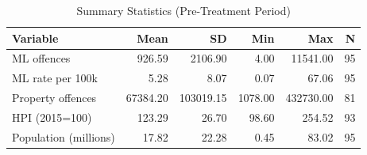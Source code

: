 \begin{table}[!h]
\centering
\caption{\label{tab:tab:summary}Summary Statistics (Pre-Treatment Period)}
\centering
\begin{tabular}[t]{lrrrrr}
\toprule
Variable & Mean & SD & Min & Max & N\\
\midrule
ML offences & 926.59 & 2106.90 & 4.00 & 11541.00 & 95\\
ML rate per 100k & 5.28 & 8.07 & 0.07 & 67.06 & 95\\
Property offences & 67384.20 & 103019.15 & 1078.00 & 432730.00 & 81\\
HPI (2015=100) & 123.29 & 26.70 & 98.60 & 254.52 & 93\\
Population (millions) & 17.82 & 22.28 & 0.45 & 83.02 & 95\\
\bottomrule
\end{tabular}
\end{table}
